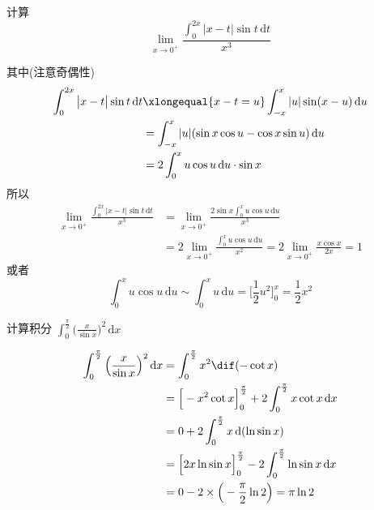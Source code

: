 \documentclass[color=green,titlestyle=hang]{elegantbook}%
\begin{document}
\begin{example}
计算 \[\lim_{x\to0^+}\frac{\displaystyle\int_{0}^{2x}\big|x-t\big|\sin t\,\mathrm{d}t}{x^3}\]
\end{example}\begin{solution}
其中(注意奇偶性) \begin{align*}\int_{0}^{2x}\big|x-t\big|\sin t\,\mathrm{d}t&\xlongequal{x-t=u}\int_{-x}^{x}|u|\sin(x-u)\,\mathrm{d}u\\
&=\int_{-x}^{x}|u|(\sin x\cos u-\cos x\sin u)\,\mathrm{d}u\\
&=2\int_{0}^{x}u\cos u\,\mathrm{d}u\cdot\sin x
\end{align*}
所以\begin{align*}\lim_{x\to0^+}\frac{\displaystyle\int_{0}^{2x}\big|x-t\big|\sin t\,\mathrm{d}t}{x^3}&=\lim_{x\to0^+}\frac{2\sin x\displaystyle\int_{0}^{x}u\cos u\,\mathrm{d}u}{x^3}\\
&=2\lim_{x\to0^+}\frac{\displaystyle\int_{0}^{x}u\cos u\,\mathrm{d}u}{x^2}=2\lim_{x\to0^+}\frac{x\cos x}{2x}=1\end{align*}
或者\begin{equation*}\int_{0}^{x}u\cos u\,\mathrm{d}u\sim\int_{0}^{x}u\,\mathrm{d}u=\Big[\frac{1}{2}u^2\Big]_{0}^{x}=\frac{1}{2}x^2\end{equation*}
\end{solution}

\begin{exercise}
计算积分 $\int_{0}^{\frac{\pi}{2}}\Big(\frac{x}{\sin x}\Big)^2\,\mathrm{d}x$
\end{exercise}\begin{solution}
\begin{align*}
\int_{0}^{\frac{\pi}{2}}\Big(\frac{x}{\sin x}\Big)^2\,\mathrm{d}x
&=\int_{0}^{\frac{\pi}{2}}x^2\dif(-\cot x)\\
&=\Big[-x^2\cot x\Big]_{0}^{\frac{\pi}{2}}+2\int_{0}^{\frac{\pi}{2}}x\cot x\,\mathrm{d}x\\
&=0+2\int_{0}^{\frac{\pi}{2}}x\,\mathrm{d}(\ln\sin x)\\
&=\Big[2x\ln\sin x\Big]_{0}^{\frac{\pi}{2}}-2\int_{0}^{\frac{\pi}{2}}\ln\sin x\,\mathrm{d}x\\
&=0-2\times\Big(-\frac{\pi}{2}\ln2\Big)=\pi\ln2
\end{align*}
\end{solution}
\end{document}
